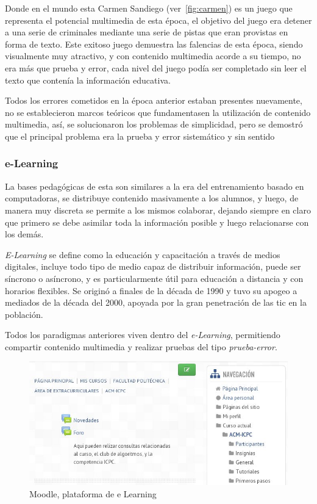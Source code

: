 Donde en el mundo esta Carmen Sandiego (ver~\ref{fig:carmen}) es un juego que
representa el potencial multimedia de esta época, el objetivo del juego era
detener a una serie de criminales mediante una serie de pistas que eran
provistas en forma de texto\cite{charsky:2010}. Este exitoso juego demuestra las
falencias de esta época, siendo visualmente muy atractivo, y con contenido
multimedia acorde a su tiempo, no era más que prueba y error, cada nivel del
juego podía ser completado sin leer el texto que contenía la información
educativa.

Todos los errores cometidos en la época anterior estaban presentes nuevamente,
no se establecieron marcos teóricos que fundamentasen la utilización de
contenido multimedia, así, se solucionaron los problemas de simplicidad, pero se
demostró que el principal problema era la prueba y error sistemático y sin
sentido\cite{egenfeldt2007third} 

\subsubsection{e-Learning}

La bases pedagógicas de esta son similares a la era del entrenamiento basado en
computadoras, se distribuye contenido masivamente a los alumnos, y luego, de
manera muy discreta se permite a los mismos colaborar, dejando siempre en claro
que primero se debe asimilar toda la información posible y luego relacionarse
con los demás\cite{leinonen:ict}.

\emph{E-Learning} se define como la educación y capacitación a través de medios
digitales, incluye todo tipo de medio capaz de distribuir información, puede ser
síncrono o asíncrono, y es particularmente útil para educación a distancia y con
horarios flexibles. Se originó a finales de la década de 1990 y tuvo su apogeo a
mediados de la década del 2000, apoyada por la gran penetración de las \Gls{tic}
en la población\cite{punie:ict}.

Todos los paradigmas anteriores viven dentro del \emph{e-Learning}, permitiendo
compartir contenido multimedia y realizar pruebas del tipo \emph{prueba-error}. 

\begin{figure}[h] \centering \includegraphics[scale=0.5]{tics/moodle.jpg}
	\caption{Moodle, plataforma de e Learning} \label{fig:moodle}
\end{figure}

